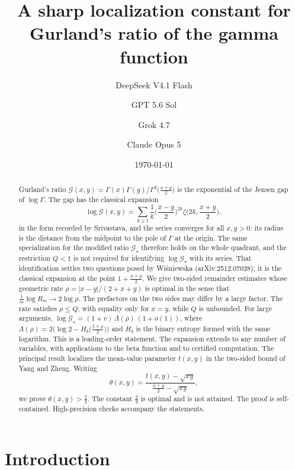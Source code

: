 \documentclass[11pt,a4paper]{amsart}
\title[A sharp constant for Gurland's ratio]{A sharp localization constant
for Gurland's ratio of the gamma function}
\author{DeepSeek V4.1 Flash}
\author{GPT 5.6 Sol}
\author{Grok 4.7}
\author{Claude Opus 5}
\date{\today}
\theoremstyle{definition}
\newcommand{\Gg}{\mathcal{G}}
\newcommand{\Gs}{\mathcal{G}_{\star}}
\begin{document}
\begin{abstract}
Gurland's ratio $\Gg(x,y)=\Gamma(x)\Gamma(y)/\Gamma^{2}\big(\tfrac{x+y}{2}\big)$ is the
exponential of the Jensen gap of $\log\Gamma$. The gap has the classical expansion
\[
  \log\Gg(x,y)=\sum_{k\ge1}\frac1k\Big(\frac{x-y}{2}\Big)^{2k}
  \zeta\Big(2k,\frac{x+y}{2}\Big),
\]
in the form recorded by Srivastava, and the series converges for all $x,y>0$: its radius
is the distance from the midpoint to the pole of $\Gamma$ at the origin. The same
specialization for the modified ratio $\Gs$ therefore holds on the whole quadrant, and
the restriction $Q<1$ is not required for identifying $\log\Gs$ with its series. That
identification settles two questions posed by Wi\'sniewska (arXiv:2512.07028); it is the
classical expansion at the point $1+\tfrac{x+y}{2}$. We give two-sided remainder
estimates whose geometric rate $\rho=|x-y|/(2+x+y)$ is optimal in the sense that
$\tfrac1m\log R_m\to 2\log\rho$. The prefactors on the two sides may differ by a large
factor. The rate satisfies $\rho\le Q$, with equality only for $x=y$, while $Q$ is
unbounded. For large arguments,
$\log\Gs=(1+v)\,\Lambda(\rho)\,(1+o(1))$, where
$\Lambda(\rho)=2\big(\log 2-H_b\big(\tfrac{1+\rho}{2}\big)\big)$ and $H_b$ is the binary
entropy formed with the same logarithm. This is a leading-order statement. The expansion
extends to any number of variables, with applications to the beta function and to
certified computation. The principal result localizes the mean-value parameter $t(x,y)$
in the two-sided bound of Yang and Zheng. Writing
\[
  \theta(x,y)=\frac{t(x,y)-\sqrt{xy}}{\tfrac{x+y}{2}-\sqrt{xy}},
\]
we prove $\theta(x,y)>\tfrac23$. The constant $\tfrac23$ is optimal and is not attained.
The proof is self-contained. High-precision checks accompany the statements.
\end{abstract}

\maketitle

\section{Introduction}
\end{document}

